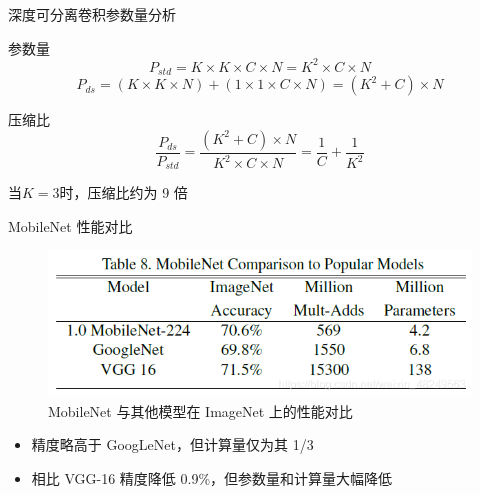 \documentclass{beamer}
\begin{document}
\begin{frame}{深度可分离卷积参数量分析}
    \begin{block}{参数量}
        \begin{equation*}
            P_{std} = K \times K \times C \times N = K^2 \times C \times N
        \end{equation*}
        \begin{equation*}
            P_{ds} = (K \times K \times N) + (1 \times 1 \times C \times N) = (K^2 + C) \times N
        \end{equation*}
    \end{block}
    
    \begin{block}{压缩比}
        \begin{equation*}
            \frac{P_{ds}}{P_{std}} = \frac{(K^2 + C) \times N}{K^2 \times C \times N} = \frac{1}{C} + \frac{1}{K^2}
        \end{equation*}
    \end{block}
    当$K=3$时，压缩比约为 9 倍
\end{frame}

\begin{frame}{MobileNet 性能对比}
    \begin{figure}
        \centering
        \includegraphics[width=0.8\linewidth]{pic/mobilenet_comp.png}
        \caption{MobileNet 与其他模型在 ImageNet 上的性能对比}
    \end{figure}
    
    \begin{itemize}
        \item 精度略高于 GoogLeNet，但计算量仅为其 1/3
        \item 相比 VGG-16 精度降低 0.9\%，但参数量和计算量大幅降低
    \end{itemize}
\end{frame}

\end{document}
